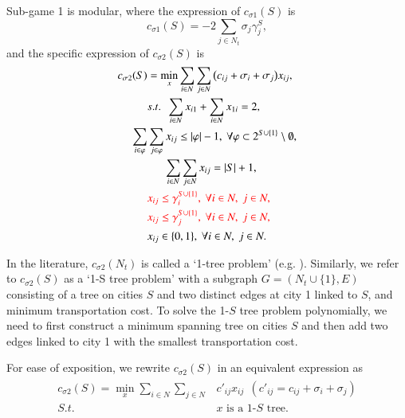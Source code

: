 \documentclass[authoryear,review,12pt]{elsarticle}
\begin{document}
Sub-game 1 is modular, where the expression of $c_{\sigma1}(S)$ is
\begin{equation*}\label{eqn:tssub1}
c_{\sigma1}(S) = - 2\sum_{j \in N_t} \sigma_j\gamma_j^S,
\end{equation*}
and the specific expression of $c_{\sigma2}(S)$ is
\begin{eqnarray*}\label{eqn:tssub2}
\begin{aligned}
c_{\sigma2}(S) &= \min_{x} \sum_{i \in N} \sum_{j \in N} \big(c_{ij} + \sigma_i + \sigma_j \big)x_{ij},\\
&s.t.~~\sum_{i \in N}x_{i1} + \sum_{i \in N}x_{1i} = 2,\\
\sum_{i \in \varphi} &\sum_{j \in \varphi} x_{ij} \leq |\varphi| - 1, ~\forall \varphi \subset 2^{S \cup \{1\}} \setminus \emptyset,\\
&~~~~~~\sum_{i \in N} \sum_{j \in N} x_{ij} = |S|+1,\\
&\textcolor{red}{x_{ij} \leq \gamma_i^{S\cup\{1\}},~\forall i \in N,~ j \in N,}\\
&\textcolor{red}{x_{ij} \leq \gamma_j^{S\cup\{1\}},~\forall i \in N,~ j \in N,}\\
&x_{ij} \in \{0,1\}, ~\forall i \in N, ~j \in N.
\end{aligned}
\end{eqnarray*}

In the literature, $c_{\sigma2}(N_t)$ is called a `1-tree problem' (e.g. \citealt{held1971traveling}).
Similarly, we refer to $c_{\sigma2}(S)$ as a `1-S tree problem' with a subgraph $G=(N_t\cup\{1\},E)$ consisting of a tree on cities $S$ and two distinct edges at city 1 linked to $S$, and minimum transportation cost.
To solve the 1-$S$ tree problem polynomially, we need to first construct a minimum spanning tree on cities $S$ and then add two edges linked to city 1 with the smallest transportation cost.

For ease of exposition, we rewrite $c_{\sigma2}(S)$ in an equivalent expression as
\begin{eqnarray*}\label{eqn:tssub2tree}
\begin{aligned}
c_{\sigma2}(S) = \min_{x} \sum_{i \in N} \sum_{j \in N} &c'_{ij}x_{ij}~~(c'_{ij} = c_{ij} + \sigma_i + \sigma_j)\\
S.t.~~&\text{$x$ is a 1-$S$ tree}.
\end{aligned}
\end{eqnarray*}
\end{document}
